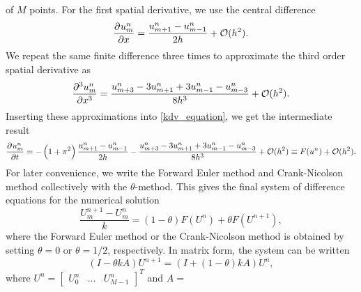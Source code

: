 of $M$ points.
For the first spatial derivative, we use the central difference
\begin{equation*}
	\dpd{u_m^n}{x} = \frac{u_{m+1}^n-u_{m-1}^n}{2 h} + \Oh(h^2).
\end{equation*}
We repeat the same finite difference three times to approximate the third order spatial derivative as 
\begin{equation*}
	\dpd[3]{u_m^n}{x} = \frac{u_{m+3}^n-3u_{m+1}^n+3u_{m-1}^n-u_{m-3}^n}{8 h^3} + \Oh(h^2).
\end{equation*}
Inserting these approximations into \cref{kdv_equation}, we get the intermediate result
\begin{equation*}
	\dpd{u_m^n}{t} = -\left(1+\pi^2\right) \frac{u_{m+1}^n-u_{m-1}^n}{2 h} - \frac{u_{m+3}^n-3u_{m+1}^n+3u_{m-1}^n-u_{m-3}^n}{8 h^3} + \Oh(h^2) \equiv F(u^n) + \Oh(h^2).
\end{equation*}
For later convenience, we write the Forward Euler method and Crank-Nicolson method collectively with the $\theta$-method.
This gives the final system of difference equations for the numerical solution
\begin{equation}\label{theta_method_discretized}
	\frac{U_m^{n+1} - U_m^n}{k} = (1-\theta) F(U^n) + \theta F(U^{n+1}),
\end{equation}
where the Forward Euler method or the Crank-Nicolson method is obtained by setting $\theta = 0$ or $\theta = 1/2$, respectively.
In matrix form, the system can be written
\begin{equation}
	\left(I - \theta k A\right) U^{n+1} = \left(I + \left(1-\theta\right) k A\right) U^n,
	\label{matrixeq}
\end{equation}
where $U^{n} = \begin{bmatrix} U_0^n & \dots & U_{M-1}^n \end{bmatrix}^T$ and $A = $
\newcommand\ca{\color{red}}
\newcommand\cb{\color{magenta}}
\newcommand\cc{\color{blue}}
\newcommand\cd{\color{cyan}}
